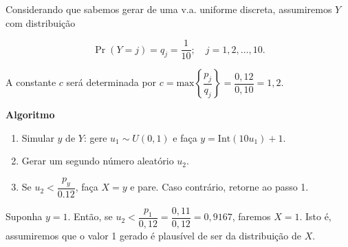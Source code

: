\documentclass[
  letterpaper,
  DIV=11,
  numbers=noendperiod]{scrreprt}
\providecommand{\tightlist}{%
  \setlength{\itemsep}{0pt}\setlength{\parskip}{0pt}}\usepackage{longtable,booktabs,array}
\begin{document}
Considerando que sabemos gerar de uma v.a. uniforme discreta,
assumiremos \(Y\) com distribuição

\[\Pr(Y=j)=q_j=\dfrac{1}{10}; \quad j=1,2, \ldots, 10.\]

A constante \(c\) será determinada por
\(c=\mbox{max}\left\{\dfrac{p_j}{q_j}\right\} =\dfrac{0,\!12}{0,\!10}=1,\!2.\)

\begin{tcolorbox}[enhanced jigsaw, left=2mm, rightrule=.15mm, toprule=.15mm, opacityback=0, leftrule=.75mm, colframe=quarto-callout-warning-color-frame, colback=white, breakable, arc=.35mm, bottomrule=.15mm]

\vspace{-3mm}\textbf{Algoritmo}\vspace{3mm}

\begin{enumerate}
\def\labelenumi{\arabic{enumi}.}
\tightlist
\item
  Simular \(y\) de \(Y\): gere \(u_1 \sim U(0,1)\) e faça
  \(y = \mathrm{Int}(10u_1)+1\).
\item
  Gerar um segundo número aleatório \(u_2\).
\item
  Se \(u_2 < \dfrac{p_y}{0.12}\), faça \(X=y\) e pare. Caso contrário,
  retorne ao passo 1.
\end{enumerate}

\end{tcolorbox}

\begin{tcolorbox}[enhanced jigsaw, left=2mm, toprule=.15mm, opacityback=0, title=\textcolor{quarto-callout-note-color}{\faInfo}\hspace{0.5em}{Nota}, leftrule=.75mm, breakable, colbacktitle=quarto-callout-note-color!10!white, coltitle=black, rightrule=.15mm, bottomtitle=1mm, toptitle=1mm, colframe=quarto-callout-note-color-frame, colback=white, opacitybacktitle=0.6, bottomrule=.15mm, arc=.35mm, titlerule=0mm]

Suponha \(y=1\). Então, se
\(u_2<\dfrac{p_1}{0,\!12}=\dfrac{0,\!11}{0,\!12}=0,\!9167\), faremos
\(X=1\). Isto é, assumiremos que o valor 1 gerado é plausível de ser da
distribuição de \(X\).

\end{tcolorbox}
\end{document}
